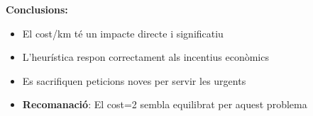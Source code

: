 \textbf{Conclusions:}
\begin{itemize}
    \item El cost/km té un impacte directe i significatiu
    \item L'heurística respon correctament als incentius econòmics
    \item Es sacrifiquen peticions noves per servir les urgents
    \item \textbf{Recomanació}: El cost=2 sembla equilibrat per aquest problema
\end{itemize}
